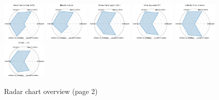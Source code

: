 \begin{figure}[ht!]
\\[1ex]
\includegraphics[width=0.1900\textwidth]{images/vocal_call_locator_vcl_radar.pdf}
\includegraphics[width=0.1900\textwidth]{images/massspecgym_radar.pdf}
\includegraphics[width=0.1900\textwidth]{images/urban_data_layer_udl_radar.pdf}
\includegraphics[width=0.1900\textwidth]{images/delta_squareddft_radar.pdf}
\includegraphics[width=0.1900\textwidth]{images/llms_for_crop_science_radar.pdf}
\\[1ex]
\includegraphics[width=0.1900\textwidth]{images/spiqa_llm_radar.pdf}
\caption{Radar chart overview (page 2)}
\end{figure}

